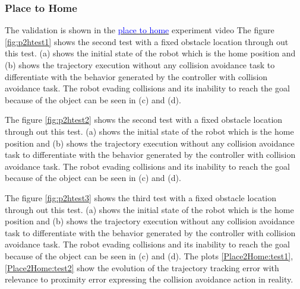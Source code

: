 \subsubsection{Place to Home}
The validation is shown in the \href{https://goo.gl/GP8KAA}{\textcolor{blue}{place to home}} experiment video
The figure \ref{fig:p2htest1} shows the second test with a fixed obstacle location through out this test. (a) shows the initial state of the robot which is the home position and (b) shows the trajectory execution without any collision avoidance task to differentiate with the behavior generated by the controller with collision avoidance task. The robot evading collisions and its inability to reach the goal because of the object can be seen in (c) and (d). 

The figure \ref{fig:p2htest2} shows the second test with a fixed obstacle location through out this test. (a) shows the initial state of the robot which is the home position and (b) shows the trajectory execution without any collision avoidance task to differentiate with the behavior generated by the controller with collision avoidance task. The robot evading collisions and its inability to reach the goal because of the object can be seen in (c) and (d). 

The figure \ref{fig:p2htest3} shows the third test with a fixed obstacle location through out this test. (a) shows the initial state of the robot which is the home position and (b) shows the trajectory execution without any collision avoidance task to differentiate with the behavior generated by the controller with collision avoidance task. The robot evading collisions and its inability to reach the goal because of the object can be seen in (c) and (d). The plots \ref{Place2Home:test1},\ref{Place2Home:test2} show the evolution of the trajectory tracking error with relevance to proximity error expressing the collision avoidance action in reality.

